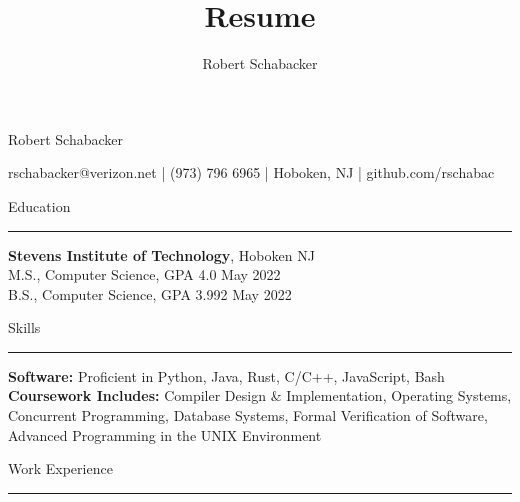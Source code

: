 \documentclass{article}
\title{Resume}
\author{Robert Schabacker}
\newcommand \spacingBetweenHeadings {0.3em}
\newcommand \spacingAfterHeadings {0.5em}
\begin{document}
\begin{center}
{\huge Robert Schabacker\par}
\vspace{0.3em}
{\Large rschabacker@verizon.net  |  (973) 796 6965  |  Hoboken, NJ  |  github.com/rschabac\par}
\end{center}
\vspace{-1.3em}
\vspace{\spacingBetweenHeadings}

\noindent
\huge Education\par
\vspace{0.1em}
\hrule
\Large
\vspace{\spacingAfterHeadings}
\noindent
\textbf{Stevens Institute of Technology}, Hoboken NJ\\
M.S., Computer Science, GPA 4.0
\hfill
May 2022\\
B.S., Computer Science, GPA 3.992
\hfill
May 2022



\vspace{\spacingBetweenHeadings}

\noindent
\huge Skills\par
\vspace{0.1em}
\hrule
\Large
\vspace{\spacingAfterHeadings}
\noindent
\textbf{Software:} Proficient in Python, Java, Rust, C/C++, JavaScript, Bash\\
\textbf{Coursework Includes:} Compiler Design \& Implementation, Operating Systems, Concurrent Programming, Database Systems, Formal Verification of Software, Advanced Programming in the UNIX Environment %


\vspace{\spacingBetweenHeadings}

\noindent
\huge Work Experience\par
\vspace{0.1em}
\hrule
\Large
\vspace{\spacingAfterHeadings}
\end{document}

